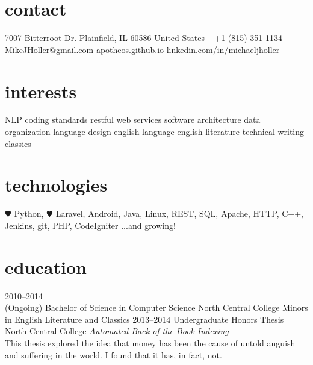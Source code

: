 \documentclass[]{friggeri-cv} %
\begin{document}


\begin{aside} %
\section{contact}
7007 Bitterroot Dr.
Plainfield, IL 60586
United States
~
+1 (815) 351 1134
~
\href{mailto:mikejholler@gmail.com}{MikeJHoller@gmail.com}
\href{http://apotheos.github.io}{apotheos.github.io}
\href{http://www.linkedin.com/in/michaeljholler}{linkedin.com/in/michaeljholler}
\section{interests}
NLP
coding standards
restful web services
software architecture
data organization
language design
english language
english literature
technical writing
classics
\section{technologies}
{\color{red} $\varheartsuit$} Python, {\color{red} $\varheartsuit$} Laravel,
Android, Java, Linux,
REST, SQL, Apache,
HTTP, C++, Jenkins,
git, PHP, CodeIgniter
...and growing!
\end{aside}


\section{education}

\begin{entrylist}
\entry
{2010--2014 \\(Ongoing)}
{Bachelor of Science {\normalfont in Computer Science}}
{North Central College}
{Minors in English Literature and Classics}
\entry
{2013--2014}
{Undergraduate {\normalfont Honors Thesis}}
{North Central College}
{\emph{Automated Back-of-the-Book Indexing} \\ This thesis explored the idea that money has been the cause of untold anguish and suffering in the world. I found that it has, in fact, not.}
\end{entrylist}
\end{document}
